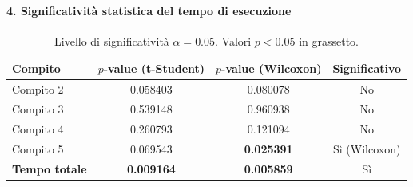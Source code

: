 \paragraph{4. Significatività statistica del tempo di esecuzione}\mbox{}\par\vspace{0.5ex}
\begin{table}[h!]
    \centering
    \small
    \begin{tabular}{lccc}
        \toprule
        \textbf{Compito} & \textbf{$p$-value (t-Student)} & \textbf{$p$-value (Wilcoxon)} & \textbf{Significativo} \\
        \midrule
        Compito 2 & 0.058403          & 0.080078          & No \\
        Compito 3 & 0.539148          & 0.960938          & No \\
        Compito 4 & 0.260793          & 0.121094          & No \\
        Compito 5 & 0.069543          & \textbf{0.025391} & Sì (Wilcoxon) \\
        \midrule
        \textbf{Tempo totale} & \textbf{0.009164} & \textbf{0.005859} & Sì \\
        \bottomrule
    \end{tabular}
    \caption*{\small Livello di significatività $\alpha = 0.05$. Valori $p < 0.05$ in grassetto.}
\end{table}

